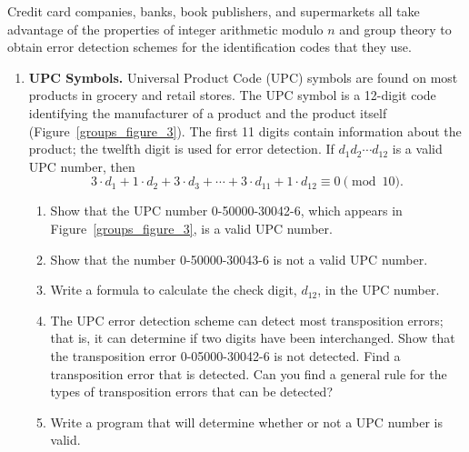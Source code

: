  
{\small
Credit card companies, banks, book publishers, and supermarkets all
take advantage of the properties of integer arithmetic modulo $n$ and
group theory to obtain error detection schemes for the identification
codes that they use. 
\begin{enumerate}
 



\item
{\bf UPC Symbols.}
Universal Product
Code (UPC) symbols are found on most
products in grocery and retail stores. The UPC symbol is a 12-digit
code identifying the manufacturer of a product and the product itself
(Figure~\ref{groups_figure_3}). The first 11 digits contain information about the
product; the twelfth digit is used for error detection. If $d_1 d_2
\cdots d_{12}$ is a valid UPC number, then  
\[
3 \cdot d_1 + 1 \cdot d_2 + 3 \cdot d_3 + \cdots + 3 \cdot
d_{11} + 1 \cdot d_{12} \equiv 0 \pmod{10}.
\]
\begin{enumerate}
 
\item
Show that the UPC number  0-50000-30042-6, which appears in
Figure~\ref{groups_figure_3}, is a valid UPC number. 
 
\item
Show that the number 0-50000-30043-6 is not a valid UPC number.
 
\item
Write a  formula to calculate the check digit, $d_{12}$, in the UPC number. 
 
\item
The  UPC error detection scheme can detect most transposition errors; that is, it can determine if two digits have been interchanged.  Show that the transposition error 0-05000-30042-6 is not detected.  Find a transposition error that is detected.  Can you find a general rule for the types of transposition errors that can be detected?
 
\item
Write a program that will determine whether or not a UPC number is valid. 
 
\end{enumerate}
 

\end{enumerate}}

